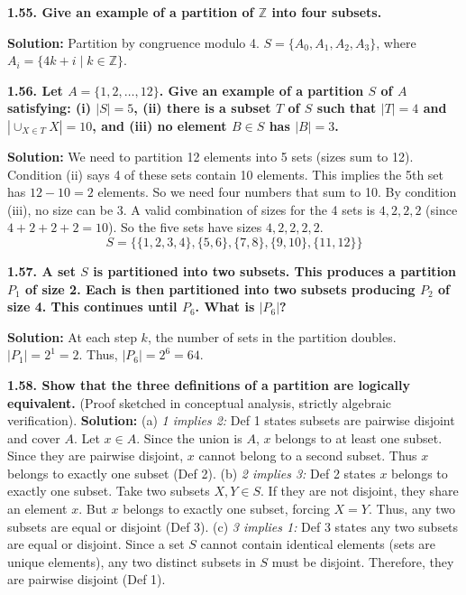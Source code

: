 \documentclass[12pt]{article}
\begin{document}
\hrulefill

\textbf{1.55. Give an example of a partition of $\mathbb{Z}$ into four subsets.}

\textbf{Solution:}
Partition by congruence modulo 4.
$S = \{A_0, A_1, A_2, A_3\}$, where $A_i = \{4k + i \mid k \in \mathbb{Z}\}$.

\hrulefill

\textbf{1.56. Let $A = \{1, 2, \ldots, 12\}$. Give an example of a partition $S$ of $A$ satisfying: (i) $|S|=5$, (ii) there is a subset $T$ of $S$ such that $|T|=4$ and $|\cup_{X \in T} X| = 10$, and (iii) no element $B \in S$ has $|B|=3$.}

\textbf{Solution:}
We need to partition 12 elements into 5 sets (sizes sum to 12).
Condition (ii) says 4 of these sets contain 10 elements. This implies the 5th set has $12 - 10 = 2$ elements.
So we need four numbers that sum to 10. By condition (iii), no size can be 3.
A valid combination of sizes for the 4 sets is $4, 2, 2, 2$ (since $4+2+2+2 = 10$).
So the five sets have sizes $4, 2, 2, 2, 2$.
\[ S = \{\{1, 2, 3, 4\}, \{5, 6\}, \{7, 8\}, \{9, 10\}, \{11, 12\}\} \]

\hrulefill

\textbf{1.57. A set $S$ is partitioned into two subsets. This produces a partition $P_1$ of size 2. Each is then partitioned into two subsets producing $P_2$ of size 4. This continues until $P_6$. What is $|P_6|$?}

\textbf{Solution:}
At each step $k$, the number of sets in the partition doubles.
$|P_1| = 2^1 = 2$.
Thus, $|P_6| = 2^6 = 64$.

\hrulefill

\textbf{1.58. Show that the three definitions of a partition are logically equivalent.}
(Proof sketched in conceptual analysis, strictly algebraic verification).
\textbf{Solution:}
(a) \textit{1 implies 2:} Def 1 states subsets are pairwise disjoint and cover $A$. Let $x \in A$. Since the union is $A$, $x$ belongs to at least one subset. Since they are pairwise disjoint, $x$ cannot belong to a second subset. Thus $x$ belongs to exactly one subset (Def 2).
(b) \textit{2 implies 3:} Def 2 states $x$ belongs to exactly one subset. Take two subsets $X, Y \in S$. If they are not disjoint, they share an element $x$. But $x$ belongs to exactly one subset, forcing $X=Y$. Thus, any two subsets are equal or disjoint (Def 3).
(c) \textit{3 implies 1:} Def 3 states any two subsets are equal or disjoint. Since a set $S$ cannot contain identical elements (sets are unique elements), any two distinct subsets in $S$ must be disjoint. Therefore, they are pairwise disjoint (Def 1).
\end{document}
